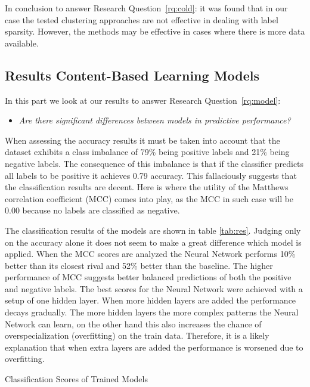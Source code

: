In conclusion to answer Research Question~\ref{rq:cold}: it was found that in our case the tested clustering approaches are not effective in dealing with label sparsity.
However, the methods may be effective in cases where there is more data available.

\subsection{Results Content-Based Learning Models}
\label{ssec:rcblm}

In this part we look at our results to answer Research Question~\ref{rq:model}:
\begin{itemize}
	\item[] \em Are there significant differences between models in predictive performance?
\end{itemize}

\noindent When assessing the accuracy results it must be taken into account that the dataset exhibits a class imbalance of 79\% being positive labels and 21\% being negative labels.
The consequence of this imbalance is that if the classifier predicts all labels to be positive it achieves 0.79 accuracy.
This fallaciously suggests that the classification results are decent.
Here is where the utility of the Matthews correlation coefficient (MCC) comes into play, as the MCC in such case will be 0.00 because no labels are classified as negative.

The classification results of the models are shown in table \ref{tab:res}.
Judging only on the accuracy alone it does not seem to make a great difference which model is applied.
When the MCC scores are analyzed the Neural Network performs 10\% better than its closest rival and 52\% better than the baseline.
The higher performance of MCC suggests better balanced predictions of both the positive and negative labels.
The best scores for the Neural Network were achieved with a setup of one hidden layer.
When more hidden layers are added the performance decays gradually.
The more hidden layers the more complex patterns the Neural Network can learn, on the other hand this also increases the chance of overspecialization (overfitting) on the train data.
Therefore, it is a likely explanation that when extra layers are added the performance is worsened due to overfitting.

\begin{table}[h]
\begin{footnotesize}

\end{footnotesize}
\caption{\label{tab:res} \footnotesize{Classification Scores of Trained Models}}
\end{table}

